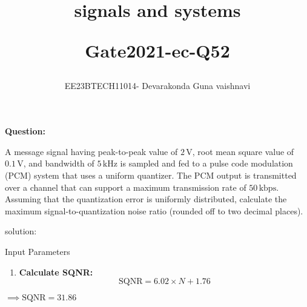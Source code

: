 \documentclass[a4,12pt,onecolumn]{IEEEtran}
\begin{document}
\title{ signals and systems
\vspace{1cm}

Gate2021-ec-Q52}
\author{EE23BTECH11014- Devarakonda Guna vaishnavi}
\maketitle
\textbf{Question:}

A message signal having peak-to-peak value of $2 \, \text{V}$, root mean square value of $0.1 \, \text{V}$, and bandwidth of $5 \, \text{kHz}$ is sampled and fed to a pulse code modulation (PCM) system that uses a uniform quantizer. The PCM output is transmitted over a channel that can support a maximum transmission rate of $50 \, \text{kbps}$. Assuming that the quantization error is uniformly distributed, calculate the maximum signal-to-quantization noise ratio (rounded off to two decimal places).

solution:
\begin{table}[h!]
    \centering
    
    \caption{Input Parameters}
    \label{table:parameters}
\end{table}


\begin{enumerate}
    
    \item \textbf{Calculate SQNR:}
    \begin{equation}\label{eq:sqnr}
        \text{SQNR} = 6.02 \times N + 1.76
         \end{equation}
\end{enumerate}




 $\implies \text{SQNR} = 31.86$

 
\end{document}
